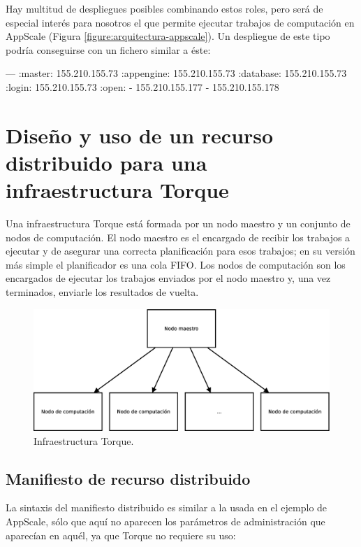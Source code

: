 Hay multitud de despliegues posibles combinando estos roles, pero será de especial interés para nosotros el que permite ejecutar trabajos de computación en AppScale (Figura \ref{figure:arquitectura-appscale}). Un despliegue de este tipo podría conseguirse con un fichero similar a éste:

\begin{yamlcode}
---
:master:    155.210.155.73
:appengine: 155.210.155.73
:database:  155.210.155.73
:login:     155.210.155.73
:open:
- 155.210.155.177
- 155.210.155.178
\end{yamlcode}


\section{Diseño y uso de un recurso distribuido para una infraestructura Torque}

Una infraestructura Torque está formada por un nodo maestro y un conjunto de nodos de computación. El nodo maestro es el encargado de recibir los trabajos a ejecutar y de asegurar una correcta planificación para esos trabajos; en su versión más simple el planificador es una cola FIFO. Los nodos de computación son los encargados de ejecutar los trabajos enviados por el nodo maestro y, una vez terminados, enviarle los resultados de vuelta.

\begin{figure} [!htbp]
  \centering
  \includegraphics[width=13.5cm]{figuras/Arquitectura_Torque.eps}
  \caption{Infraestructura Torque.}
\label{figure:arquitectura-torque}
\end{figure}

\subsection{Manifiesto de recurso distribuido}

La sintaxis del manifiesto distribuido es similar a la usada en el ejemplo de AppScale, sólo que aquí no aparecen los parámetros de administración que aparecían en aquél, ya que Torque no requiere su uso:

